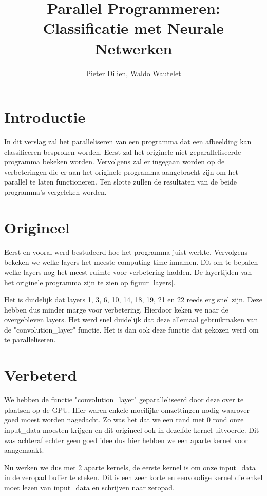 \documentclass[a4paper, 12pt, one column]{article}
\title{Parallel Programmeren: Classificatie met Neurale Netwerken}
\author{Pieter Dilien, Waldo Wautelet}
\begin{document}
\maketitle

\section{Introductie}
In dit verslag zal het paralleliseren van een programma dat een afbeelding kan classificeren besproken worden.
Eerst zal het originele niet-geparalleliseerde programma bekeken worden. Vervolgens zal er ingegaan worden op 
de verbeteringen die er aan het originele programma aangebracht zijn om het parallel te laten functioneren. Ten slotte
zullen de resultaten van de beide programma's vergeleken worden.

\section{Origineel}
Eerst en vooral werd bestudeerd hoe het programma juist werkte. Vervolgens bekeken we welke layers het meeste computing time 
innamen. Dit om te bepalen welke layers nog het meest ruimte voor verbetering hadden. De layertijden van het originele programma
zijn te zien op figuur \ref{layers}.

\medskip
\noindent
Het is duidelijk dat layers 1, 3, 6, 10, 14, 18, 19, 21 en 22 reeds erg snel zijn. Deze hebben dus minder marge voor verbetering.
Hierdoor keken we naar de overgebleven layers. Het werd snel duidelijk dat deze allemaal gebruikmaken van de "convolution\_layer" functie.
Het is dan ook deze functie dat gekozen werd om te paralleliseren.

\section{Verbeterd}
We hebben de functie "convolution\_layer" geparalleliseerd door deze over te plaatsen op de GPU. 
Hier waren enkele moeilijke omzettingen nodig waarover goed moest worden nagedacht.
Zo was het dat we een rand met 0 rond onze input\_data moesten krijgen en dit origineel ook in dezelfde kernel 
uitvoerde. Dit was achteraf echter geen goed idee dus hier hebben we een aparte kernel voor aangemaakt.

\medskip
\noindent
Nu werken we dus met 2 aparte kernels, de eerste kernel is om onze input\_data in de zeropad buffer te steken. 
Dit is een zeer korte en eenvoudige kernel die enkel moet lezen van input\_data en schrijven naar zeropad.
\end{document}
